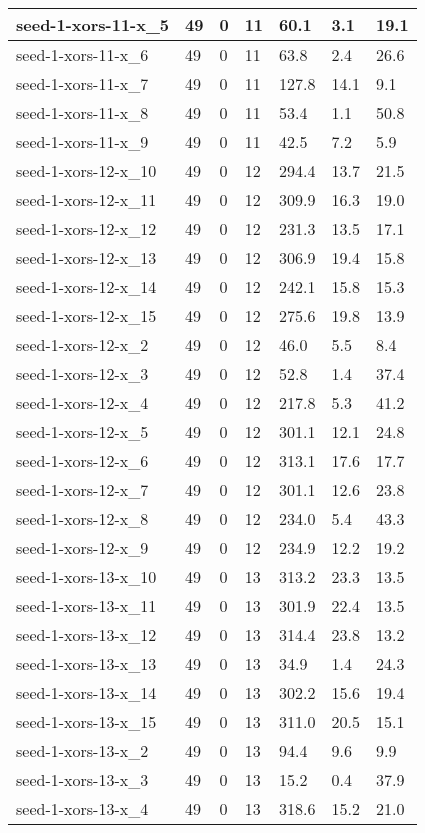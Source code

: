 \begin{scriptsize}
\begin{longtable}{|p{5cm}|l|l|l|l|l|l|}
seed-1-xors-11-x\_5&49&0&11&60.1&3.1&19.1 \\ \hline 
seed-1-xors-11-x\_6&49&0&11&63.8&2.4&26.6 \\ \hline 
seed-1-xors-11-x\_7&49&0&11&127.8&14.1&9.1 \\ \hline 
seed-1-xors-11-x\_8&49&0&11&53.4&1.1&50.8 \\ \hline 
seed-1-xors-11-x\_9&49&0&11&42.5&7.2&5.9 \\ \hline 
seed-1-xors-12-x\_10&49&0&12&294.4&13.7&21.5 \\ \hline 
seed-1-xors-12-x\_11&49&0&12&309.9&16.3&19.0 \\ \hline 
seed-1-xors-12-x\_12&49&0&12&231.3&13.5&17.1 \\ \hline 
seed-1-xors-12-x\_13&49&0&12&306.9&19.4&15.8 \\ \hline 
seed-1-xors-12-x\_14&49&0&12&242.1&15.8&15.3 \\ \hline 
seed-1-xors-12-x\_15&49&0&12&275.6&19.8&13.9 \\ \hline 
seed-1-xors-12-x\_2&49&0&12&46.0&5.5&8.4 \\ \hline 
seed-1-xors-12-x\_3&49&0&12&52.8&1.4&37.4 \\ \hline 
seed-1-xors-12-x\_4&49&0&12&217.8&5.3&41.2 \\ \hline 
seed-1-xors-12-x\_5&49&0&12&301.1&12.1&24.8 \\ \hline 
seed-1-xors-12-x\_6&49&0&12&313.1&17.6&17.7 \\ \hline 
seed-1-xors-12-x\_7&49&0&12&301.1&12.6&23.8 \\ \hline 
seed-1-xors-12-x\_8&49&0&12&234.0&5.4&43.3 \\ \hline 
seed-1-xors-12-x\_9&49&0&12&234.9&12.2&19.2 \\ \hline 
seed-1-xors-13-x\_10&49&0&13&313.2&23.3&13.5 \\ \hline 
seed-1-xors-13-x\_11&49&0&13&301.9&22.4&13.5 \\ \hline 
seed-1-xors-13-x\_12&49&0&13&314.4&23.8&13.2 \\ \hline 
seed-1-xors-13-x\_13&49&0&13&34.9&1.4&24.3 \\ \hline 
seed-1-xors-13-x\_14&49&0&13&302.2&15.6&19.4 \\ \hline 
seed-1-xors-13-x\_15&49&0&13&311.0&20.5&15.1 \\ \hline 
seed-1-xors-13-x\_2&49&0&13&94.4&9.6&9.9 \\ \hline 
seed-1-xors-13-x\_3&49&0&13&15.2&0.4&37.9 \\ \hline 
seed-1-xors-13-x\_4&49&0&13&318.6&15.2&21.0 \\ \hline 

\end{longtable}
\end{scriptsize}
